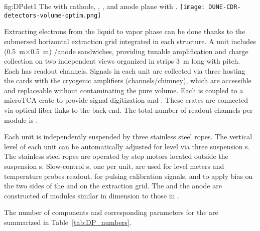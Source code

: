 \begin{dunefigure}{fig:DPdet1}
  {The  with cathode, , , and anode plane with .}
  \texttt{[image: DUNE-CDR-detectors-volume-optim.png]}
\end{dunefigure}

Extracting electrons from the liquid to vapor phase can be done thanks to the submersed horizontal extraction grid integrated in each  structure. A  unit includes \dpswchpercrp (0.5~m$\times$0.5~m) /anode sandwiches, providing tunable amplification and charge collection on two independent views organized in strips \SI{3}{m} long with \dpstrippitch pitch. Each  has \dpchpercrp readout channels. Signals in each  unit are collected via three  hosting the  cards with the cryogenic  amplifiers (\dpchperchimney channels/chimney), which are accessible and replaceable without contaminating the pure  volume. Each  is coupled to a microTCA crate to provide signal digitization and  . These crates are connected  via optical fiber links to the  back-end. The total number of readout channels  per \nominalmodsize module is \dpnumcrpch.

Each  unit is independently suspended by three stainless steel ropes. The vertical level of each  unit can be automatically adjusted for  level via three suspension \fdth{}s. The stainless steel ropes are operated by step motors located outside the suspension \fdth{}s. Slow-control \fdth{}s,  one per  unit, are used for level meters and temperature probes readout,   for pulsing calibration signals, and to apply  bias on the two sides of the  and on the extraction grid. The  and the anode are constructed of modules similar in dimension to those in .

The number of components and corresponding parameters for the \dpactivelarmass {} are summarized in Table~\ref{tab:DP_numbers}.

